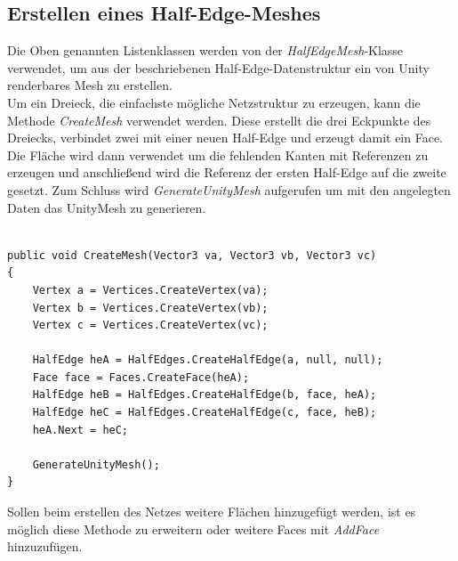 \subsection{Erstellen eines Half-Edge-Meshes}
Die Oben genannten Listenklassen werden von der \textit{HalfEdgeMesh}-Klasse verwendet, um aus der beschriebenen Half-Edge-Datenstruktur ein von Unity renderbares Mesh zu erstellen. 
\\
Um ein Dreieck, die einfachste m\"ogliche Netzstruktur zu erzeugen, kann die Methode \textit{CreateMesh} verwendet werden. Diese erstellt die drei Eckpunkte des Dreiecks, verbindet zwei mit einer neuen Half-Edge und erzeugt damit ein Face. Die Fl\"ache wird dann verwendet um die fehlenden Kanten mit Referenzen zu erzeugen und anschlie{\ss}end wird die Referenz der ersten Half-Edge auf die zweite gesetzt. Zum Schluss wird \textit{GenerateUnityMesh} aufgerufen um mit den angelegten Daten das UnityMesh zu generieren.
\begin{lstlisting}

public void CreateMesh(Vector3 va, Vector3 vb, Vector3 vc)
{
	Vertex a = Vertices.CreateVertex(va);
	Vertex b = Vertices.CreateVertex(vb);
	Vertex c = Vertices.CreateVertex(vc);

	HalfEdge heA = HalfEdges.CreateHalfEdge(a, null, null);
	Face face = Faces.CreateFace(heA);
	HalfEdge heB = HalfEdges.CreateHalfEdge(b, face, heA);
	HalfEdge heC = HalfEdges.CreateHalfEdge(c, face, heB);
	heA.Next = heC;

	GenerateUnityMesh();
}

\end{lstlisting}
Sollen beim erstellen des Netzes weitere Fl\"achen hinzugef\"ugt werden, ist es m\"oglich diese Methode zu erweitern oder weitere Faces mit \textit{AddFace} hinzuzuf\"ugen.

